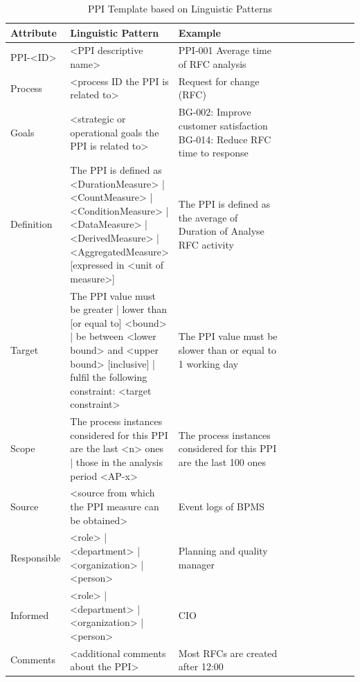\begin{table}[htbp]
	\footnotesize
	\centering
	\begin{tabular}[t]{@{}l p{0.3\linewidth} p{0.4\linewidth} p{0.5\linewidth} @{}}
		\toprule
		\textbf{Attribute} & \textbf{Linguistic Pattern}  & \textbf{Example}\\
		\midrule
		PPI-<ID> & <PPI descriptive name> & PPI-001 Average time of RFC analysis
		\\
		Process	& <process ID the PPI is related to> & Request for change (RFC)
		\\
		Goals & <strategic or operational goals the PPI is related to> & BG-002: Improve customer satisfaction \newline
		BG-014: Reduce RFC time to response
		\\
		Definition & The PPI is defined as { \newline
			<DurationMeasure> | <CountMeasure> | <ConditionMeasure> |
			<DataMeasure> | <DerivedMeasure> | <AggregatedMeasure> }
		[expressed in <unit of measure>] & The PPI is defined as the average of Duration of Analyse RFC activity
		\\
		Target & The PPI value must { \newline
			be {greater | lower} than [or equal to] <bound> | \newline
			be between <lower bound> and <upper bound> [inclusive] |\newline
			fulfil the following constraint: <target constraint> } & The PPI value must be slower than or equal to 1 working day
		\\
		Scope & The process instances considered for this PPI are {
			the last <n> ones |
			those in the analysis period <AP-x> } & The process instances considered for this PPI are the last 100 ones
		\\
		Source & <source from which the PPI measure can be obtained> &	Event logs of BPMS
		\\
		Responsible & { <role> | <department> | <organization> | <person> } &	Planning and quality manager
		\\
		Informed &{ <role> | <department> | <organization> | <person> } & CIO
		\\
		Comments & <additional comments about the PPI> & Most RFCs are created after 12:00
		\\
\bottomrule
\end{tabular}
\caption{PPI Template based on Linguistic Patterns \cite{article:ProcessPerfInd}}
\label{tbl:Fact-Sheet-PPI}
\end{table}


